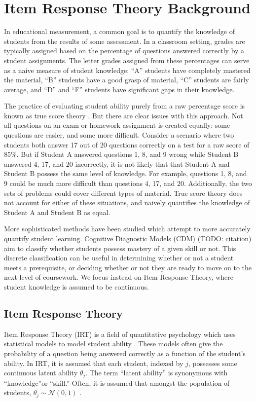 \chapter{Item Response Theory Background} \label{ch:irt_background}

In educational measurement, a common goal is to quantify the knowledge of students from the results of some assessment. In a classroom setting, grades are typically assigned based on the percentage of questions answered correctly by a student assignments. The letter grades assigned from these percentages can serve as a naive measure of student knowledge; ``A'' students have completely mastered the material, ``B'' students have a good grasp of material, ``C'' students are fairly average, and ``D'' and ``F'' students have significant gaps in their knowledge.

The practice of evaluating student ability purely from a raw percentage score is known as true score theory \cite{thissen}. But there are clear issues with this approach. Not all questions on an exam or homework assignment is created equally: some questions are easier, and some more difficult. Consider a scenario where two students both answer 17 out of 20 questions correctly on a test for a raw score of $85\%$. But if Student A answered questions 1, 8, and 9 wrong while Student B answered 4, 17, and 20 incorrectly, it is not likely that that Student A and Student B possess the same level of knowledge. For example, questions 1, 8, and 9 could be much more difficult than questions 4, 17, and 20. Additionally, the two sets of problems could cover different types of material. True score theory does not account for either of these situations, and naively quantifies the knowledge of Student A and Student B as equal.

More sophisticated methods have been studied which attempt to more accurately quantify student learning. Cognitive Diagnostic Models (CDM) (TODO: citation) aim to classify whether students possess mastery of a given skill or not. This discrete classification can be useful in determining whether or not a student meets a prerequisite, or deciding whether or not they are ready to move on to the next level of coursework. We focus instead on Item Response Theory, where student knowledge is assumed to be continuous.

\section{Item Response Theory}
Item Response Theory (IRT) is a field of quantitative psychology which uses statistical models to model student ability \cite{lord1968}. These models often give the probability of a question being answered correctly as a function of the student's ability. In IRT, it is assumed that each student, indexed by $j$, possesses some continuous latent ability $\theta_j$. The term ``latent ability'' is synonymous with ``knowledge''or ``skill.'' Often, it is assumed that amongst the population of students, $\theta_j \sim \mathcal{N}(0,1)$ \cite{thissen}. 

